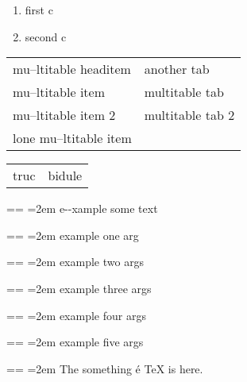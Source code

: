 \documentclass{book}
\makeatletter
\newenvironment{GNUTexinfopreformatted}{%
  \par\obeylines\obeyspaces\frenchspacing
  \parskip=\z@\parindent=\z@}{}
\makeatother
\begin{document}
\begin{titlepage}
\begin{enumerate}[label=\alph*.,start=3]
\item first c
\item second c
\end{enumerate}

\begin{tabular}{m{} m{}}%
mu--ltitable headitem &another tab\\
mu--ltitable item &multitable tab\\
mu--ltitable item 2 &multitable tab 2
\index[cp]{index entry within multitable}%
\\
lone mu--ltitable item&\\
\end{tabular}%

\begin{tabular}{m{} m{}}%
truc &bidule\\
\end{tabular}%

\begin{GNUTexinfopreformatted}
\leftskip=2em\relax\ttfamily%
e{-}{-}xample  some
   text
\end{GNUTexinfopreformatted}

\begin{GNUTexinfopreformatted}
\leftskip=2em\relax\ttfamily%
example one arg
\end{GNUTexinfopreformatted}

\begin{GNUTexinfopreformatted}
\leftskip=2em\relax\ttfamily%
example two args
\end{GNUTexinfopreformatted}

\begin{GNUTexinfopreformatted}
\leftskip=2em\relax\ttfamily%
example three args
\end{GNUTexinfopreformatted}

\begin{GNUTexinfopreformatted}
\leftskip=2em\relax\ttfamily%
example four args
\end{GNUTexinfopreformatted}

\begin{GNUTexinfopreformatted}
\leftskip=2em\relax\ttfamily%
example five args
\end{GNUTexinfopreformatted}

\begin{GNUTexinfopreformatted}
\leftskip=2em\relax\ttfamily%
The something \'{e} \TeX{} is here.
\end{GNUTexinfopreformatted}


\end{titlepage}
\end{document}
